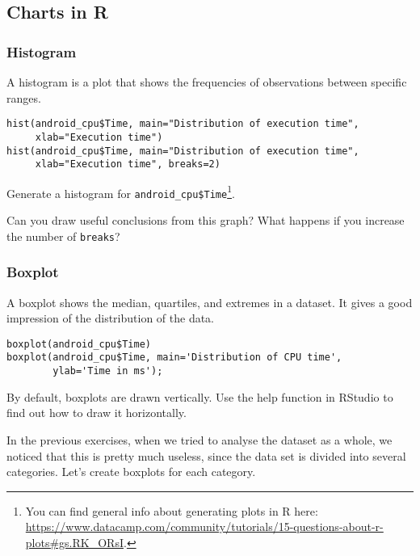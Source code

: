 \subsection{Charts in R}
\subsubsection{Histogram}

A histogram is a plot that shows the frequencies of observations between specific ranges.

\begin{lstlisting}
hist(android_cpu$Time, main="Distribution of execution time",
     xlab="Execution time")
hist(android_cpu$Time, main="Distribution of execution time",
     xlab="Execution time", breaks=2)
\end{lstlisting}

\begin{exercise}
Generate a histogram for \texttt{android\_cpu\$Time}\footnote{You can find general info about generating plots in R here:  \url{https://www.datacamp.com/community/tutorials/15-questions-about-r-plots\#gs.RK_ORsI}.}.
 
Can you draw useful conclusions from this graph? What happens if you increase the number of \texttt{breaks}?
\end{exercise}

\subsubsection{Boxplot}

A boxplot shows the median, quartiles, and extremes in a dataset. It gives a good impression of the distribution of the data.

\begin{lstlisting}
boxplot(android_cpu$Time)
boxplot(android_cpu$Time, main='Distribution of CPU time',
        ylab='Time in ms');
\end{lstlisting} 

\begin{exercise}
  By default, boxplots are drawn vertically. Use the help function in RStudio to find out how to draw it horizontally.
\end{exercise}

In the previous exercises, when we tried to analyse the dataset as a whole, we noticed that this is pretty much useless, since the data set is divided into several categories. Let's create boxplots for each category.

